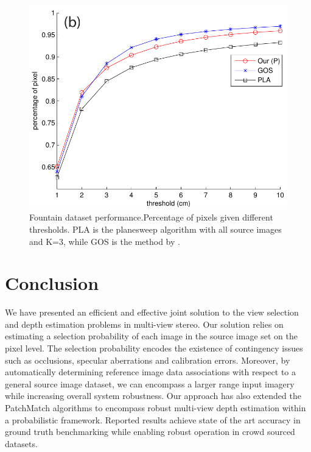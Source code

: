 \begin{figure}[]
\centering
\centering
\includegraphics[width=0.60\linewidth]{chapter3/resource/compareGoesele.pdf}
\caption{Fountain dataset performance.Percentage of pixels given different thresholds.  PLA is the planesweep algorithm with all source images and K=3, while GOS is the method by \citet{Goesele07}.}
\label{fig:compareGoesele}
\end{figure}


\section{Conclusion}
We have presented an efficient and effective joint solution to the view selection and depth estimation problems in multi-view stereo. Our solution relies on estimating a selection probability of each image in the source image set on the pixel level. The selection probability encodes the existence of contingency issues such as occlusions, specular aberrations and calibration errors. Moreover, by automatically determining reference image data associations with respect to a general source image dataset, we can encompass a larger range input imagery while increasing overall system robustness. Our approach has also extended the PatchMatch algorithms to encompass robust multi-view depth estimation within a probabilistic framework. Reported results achieve state of the art accuracy in ground truth benchmarking while enabling robust operation in crowd sourced datasets. 


